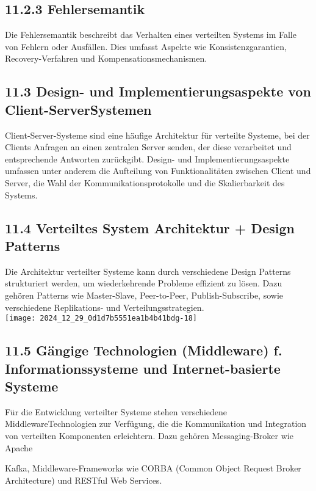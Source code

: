 \subsection*{11.2.3 Fehlersemantik}
Die Fehlersemantik beschreibt das Verhalten eines verteilten Systems im Falle von Fehlern oder Ausfällen. Dies umfasst Aspekte wie Konsistenzgarantien, Recovery-Verfahren und Kompensationsmechanismen.

\subsection*{11.3 Design- und Implementierungsaspekte von Client-ServerSystemen}
Client-Server-Systeme sind eine häufige Architektur für verteilte Systeme, bei der Clients Anfragen an einen zentralen Server senden, der diese verarbeitet und entsprechende Antworten zurückgibt. Design- und Implementierungsaspekte umfassen unter anderem die Aufteilung von Funktionalitäten zwischen Client und Server, die Wahl der Kommunikationsprotokolle und die Skalierbarkeit des Systems.

\subsection*{11.4 Verteiltes System Architektur + Design Patterns}
Die Architektur verteilter Systeme kann durch verschiedene Design Patterns strukturiert werden, um wiederkehrende Probleme effizient zu lösen. Dazu gehören Patterns wie Master-Slave, Peer-to-Peer, Publish-Subscribe, sowie verschiedene Replikations- und Verteilungsstrategien.\\
\texttt{[image: 2024\_12\_29\_0d1d7b5551ea1b4b41bdg-18]}

\subsection*{11.5 Gängige Technologien (Middleware) f. Informationssysteme und Internet-basierte Systeme}
Für die Entwicklung verteilter Systeme stehen verschiedene MiddlewareTechnologien zur Verfügung, die die Kommunikation und Integration von verteilten Komponenten erleichtern. Dazu gehören Messaging-Broker wie Apache

Kafka, Middleware-Frameworks wie CORBA (Common Object Request Broker Architecture) und RESTful Web Services.

